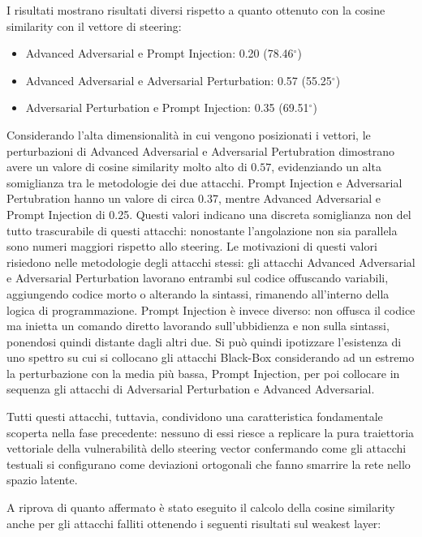 I risultati mostrano risultati diversi rispetto a quanto ottenuto con la cosine similarity con il vettore di steering:

\begin{itemize}[noitemsep]
    \item Advanced Adversarial e Prompt Injection: 0.20 (78.46$^\circ$)
    \item Advanced Adversarial e Adversarial Perturbation: 0.57 (55.25$^\circ$)
    \item Adversarial Perturbation e Prompt Injection: 0.35 (69.51$^\circ$)
\end{itemize}

Considerando l'alta dimensionalità in cui vengono posizionati i vettori, le perturbazioni di Advanced Adversarial e Adversarial Pertubration dimostrano avere un valore di cosine similarity molto alto di $0.57$, evidenziando un alta somiglianza tra le metodologie dei due attacchi.
Prompt Injection e Adversarial Pertubration hanno un valore di circa 0.37, mentre Advanced Adversarial e Prompt Injection di 0.25. Questi valori indicano una discreta somiglianza non del tutto trascurabile di questi attacchi: nonostante l'angolazione non sia parallela sono numeri maggiori rispetto allo steering.
Le motivazioni di questi valori risiedono nelle metodologie degli attacchi stessi: gli attacchi Advanced Adversarial e Adversarial Perturbation lavorano entrambi sul codice offuscando variabili, aggiungendo codice morto o alterando la sintassi, rimanendo all'interno della logica di programmazione.
Prompt Injection è invece diverso: non offusca il codice ma inietta un comando diretto lavorando sull'ubbidienza e non sulla sintassi, ponendosi quindi distante dagli altri due.
Si può quindi ipotizzare l'esistenza di uno spettro su cui si collocano gli attacchi Black-Box considerando ad un estremo la perturbazione con la media più bassa, Prompt Injection, per poi collocare in sequenza gli attacchi di Adversarial Perturbation e Advanced Adversarial.

Tutti questi attacchi, tuttavia, condividono una caratteristica fondamentale scoperta nella fase precedente: nessuno di essi riesce a replicare la pura traiettoria vettoriale della vulnerabilità dello steering vector confermando come gli attacchi testuali si configurano come deviazioni ortogonali che fanno smarrire la rete nello spazio latente.

A riprova di quanto affermato è stato eseguito il calcolo della cosine similarity anche per gli attacchi falliti ottenendo i seguenti risultati sul weakest layer:

